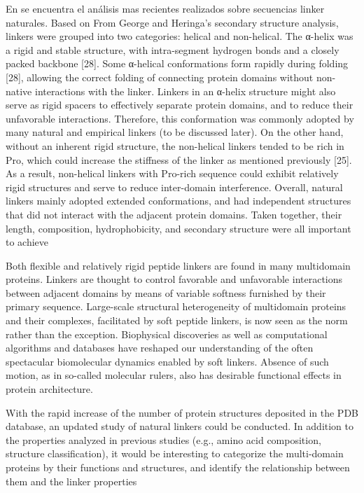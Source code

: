 En \cite{george2002analysis} se encuentra el análisis mas recientes realizados sobre secuencias linker naturales.
Based on From George and
Heringa’s secondary structure analysis, linkers were grouped into two categories: helical and
non-helical. The α-helix was a rigid and stable structure, with intra-segment hydrogen bonds
and a closely packed backbone [28]. Some α-helical conformations form rapidly during
folding [28], allowing the correct folding of connecting protein domains without non-native
interactions with the linker. Linkers in an α-helix structure might also serve as rigid spacers
to effectively separate protein domains, and to reduce their unfavorable interactions.
Therefore, this conformation was commonly adopted by many natural and empirical linkers
(to be discussed later). On the other hand, without an inherent rigid structure, the non-helical
linkers tended to be rich in Pro, which could increase the stiffness of the linker as mentioned
previously [25]. As a result, non-helical linkers with Pro-rich sequence could exhibit
relatively rigid structures and serve to reduce inter-domain interference.
Overall, natural linkers mainly adopted extended conformations, and had independent
structures that did not interact with the adjacent protein domains. Taken together, their
length, composition, hydrophobicity, and secondary structure were all important to achieve



Both flexible and relatively rigid peptide linkers are found in many multidomain proteins. 
Linkers are thought to control favorable and unfavorable interactions between adjacent domains by means of variable softness
furnished by their primary sequence. Large-scale structural heterogeneity of multidomain proteins
and their complexes, facilitated by soft peptide linkers, is now seen as the norm rather than the
exception. Biophysical discoveries as well as computational algorithms and databases have
reshaped our understanding of the often spectacular biomolecular dynamics enabled by soft linkers.
Absence of such motion, as in so-called molecular rulers, also has desirable functional effects in
protein architecture.





With the rapid increase of the number of protein structures deposited in the PDB database, an updated study of natural linkers could be conducted. 
In addition to the properties analyzed in previous studies (e.g., amino acid composition, structure classification), 
it would be interesting to categorize the multi-domain proteins by their functions and structures, and identify the relationship between them and the linker properties




